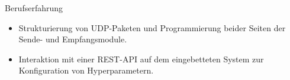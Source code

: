\begin{rubric}{Berufserfahrung}
\vspace{\CVItemizeHeaderSpacing} \begin{itemize}[leftmargin=*, rightmargin=1cm]
	\setlength{\itemsep}{\CVItemizeSpacing}  
	\item Strukturierung von UDP-Paketen und Programmierung beider Seiten der Sende- und Empfangsmodule.  
	\item Interaktion mit einer REST-API auf dem eingebetteten System zur Konfiguration von Hyperparametern.  
\end{itemize}
\begin{comment}
%
%
\entry*[] \textbf{Creative Edge LLC} \hfill 08.2017 -- 09.2018 \newline  
 \emph{Softwareentwickler} \hfill Denver, USA \newline  
\vspace{\CVItemizeHeaderSpacing} \begin{itemize}[leftmargin=*, rightmargin=1cm] 
	\setlength{\itemsep}{\CVItemizeSpacing}  
	\item Entwicklung von Anwendungen für das Kryptowährungs-Mining unter Windows und Linux.  
	\item Erstellung von Software zur Verwaltung von Betriebssystemtreibern,  System- ~~~~~~~~~~~~konfigurationen und Tools von Drittanbietern.  
\end{itemize}
\end{comment}
\end{rubric}
